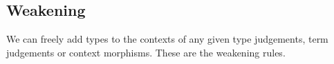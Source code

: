 \begin{code}\>\<%
\\
\>  \<%
\\
\>[0]\<[2]%
\>[2] \<[7]%
\>[7]\AgdaSymbol{:} \AgdaSymbol{\}}    \<%
\\
\>[0]\<[2]%
\>[2]\AgdaInductiveConstructor{\_,\_} \<[7]%
\>[7]\AgdaSymbol{:}  \AgdaSymbol{\}(} \AgdaSymbol{:}   \AgdaSymbol{)\{} \AgdaSymbol{:}  \AgdaSymbol{\}(} \AgdaSymbol{:}  \AgdaSymbol{(} \AgdaFunction{[}  \AgdaFunction{]T}\AgdaSymbol{))}\<%
\\
\>[2]\<[7]%
\>[7]   \AgdaSymbol{(} \AgdaInductiveConstructor{,} \AgdaSymbol{)}\<%
\\
\>\<\end{code}

\subsection{Weakening}

We can freely add types to the contexts of any given type judgements,
term judgements or context morphisms. These are the weakening rules.

\begin{code}\>\>[2]\<[3]%
\>[3]\<%
\\
\> \<[7]%
\>[7]\AgdaSymbol{:} \AgdaSymbol{\}(} \AgdaSymbol{:}  \AgdaSymbol{)(} \AgdaSymbol{:}  \AgdaSymbol{)}   \AgdaSymbol{(} \AgdaInductiveConstructor{,} \AgdaSymbol{)}\<%
\\
\> \<[7]%
\>[7]\AgdaSymbol{:}  \AgdaSymbol{\}(} \AgdaSymbol{:}  \AgdaSymbol{)(} \AgdaSymbol{:}  \AgdaSymbol{)}   \AgdaSymbol{(}  \AgdaSymbol{)} \<[52]%
\>[52]\<%
\\
\> \<[7]%
\>[7]\AgdaSymbol{:}  \AgdaSymbol{\}(} \AgdaSymbol{:}   \AgdaSymbol{)(} \AgdaSymbol{:}  \AgdaSymbol{)}  \AgdaSymbol{(} \AgdaInductiveConstructor{,} \AgdaSymbol{)}   \<[53]%
\>[53]\<%
\\
\>\<\end{code}

